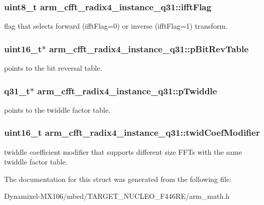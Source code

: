 \subsubsection[{\texorpdfstring{ifft\+Flag}{ifftFlag}}]{\setlength{\rightskip}{0pt plus 5cm}uint8\+\_\+t arm\+\_\+cfft\+\_\+radix4\+\_\+instance\+\_\+q31\+::ifft\+Flag}\hypertarget{structarm__cfft__radix4__instance__q31_adc0a62ba669ad2282ecbe43d5d96abab}{}\label{structarm__cfft__radix4__instance__q31_adc0a62ba669ad2282ecbe43d5d96abab}
flag that selects forward (ifft\+Flag=0) or inverse (ifft\+Flag=1) transform. 
\subsubsection[{\texorpdfstring{p\+Bit\+Rev\+Table}{pBitRevTable}}]{\setlength{\rightskip}{0pt plus 5cm}uint16\+\_\+t$\ast$ arm\+\_\+cfft\+\_\+radix4\+\_\+instance\+\_\+q31\+::p\+Bit\+Rev\+Table}\hypertarget{structarm__cfft__radix4__instance__q31_a33a3bc774c97373261699463c05dfe54}{}\label{structarm__cfft__radix4__instance__q31_a33a3bc774c97373261699463c05dfe54}
points to the bit reversal table. 
\subsubsection[{\texorpdfstring{p\+Twiddle}{pTwiddle}}]{\setlength{\rightskip}{0pt plus 5cm}q31\+\_\+t$\ast$ arm\+\_\+cfft\+\_\+radix4\+\_\+instance\+\_\+q31\+::p\+Twiddle}\hypertarget{structarm__cfft__radix4__instance__q31_a561c22dee4cbdcfa0fd5f15106ecc306}{}\label{structarm__cfft__radix4__instance__q31_a561c22dee4cbdcfa0fd5f15106ecc306}
points to the twiddle factor table. 
\subsubsection[{\texorpdfstring{twid\+Coef\+Modifier}{twidCoefModifier}}]{\setlength{\rightskip}{0pt plus 5cm}uint16\+\_\+t arm\+\_\+cfft\+\_\+radix4\+\_\+instance\+\_\+q31\+::twid\+Coef\+Modifier}\hypertarget{structarm__cfft__radix4__instance__q31_a8cf8187b8232815cf17ee82bf572ecf9}{}\label{structarm__cfft__radix4__instance__q31_a8cf8187b8232815cf17ee82bf572ecf9}
twiddle coefficient modifier that supports different size F\+F\+Ts with the same twiddle factor table. 

The documentation for this struct was generated from the following file\+:\begin{DoxyCompactItemize}
\item 
Dynamixel-\/\+M\+X106/mbed/\+T\+A\+R\+G\+E\+T\+\_\+\+N\+U\+C\+L\+E\+O\+\_\+\+F446\+R\+E/arm\+\_\+math.\+h\end{DoxyCompactItemize}
